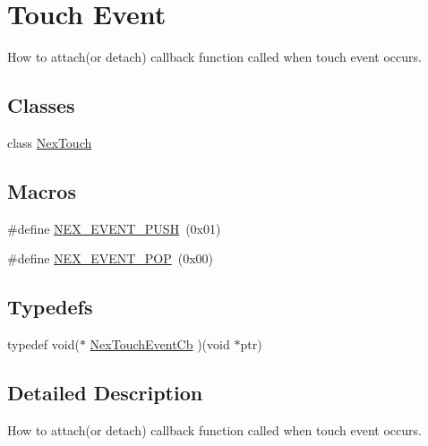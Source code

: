 \hypertarget{group___touch_event}{\section{Touch Event}
\label{group___touch_event}
}


How to attach(or detach) callback function called when touch event occurs.  


\subsection*{Classes}
\begin{DoxyCompactItemize}
\item 
class \hyperlink{class_nex_touch}{Nex\+Touch}
\end{DoxyCompactItemize}
\subsection*{Macros}
\begin{DoxyCompactItemize}
\item 
\#define \hyperlink{group___touch_event_ga748c37a9bbe04ddc680fe1686154fefb}{N\+E\+X\+\_\+\+E\+V\+E\+N\+T\+\_\+\+P\+U\+S\+H}~(0x01)
\item 
\#define \hyperlink{group___touch_event_ga5db3d99f88ac878875ca47713b7a54b6}{N\+E\+X\+\_\+\+E\+V\+E\+N\+T\+\_\+\+P\+O\+P}~(0x00)
\end{DoxyCompactItemize}
\subsection*{Typedefs}
\begin{DoxyCompactItemize}
\item 
typedef void($\ast$ \hyperlink{group___touch_event_ga162dea47b078e8878d10d6981a9dd0c6}{Nex\+Touch\+Event\+Cb} )(void $\ast$ptr)
\end{DoxyCompactItemize}


\subsection{Detailed Description}
How to attach(or detach) callback function called when touch event occurs. 



